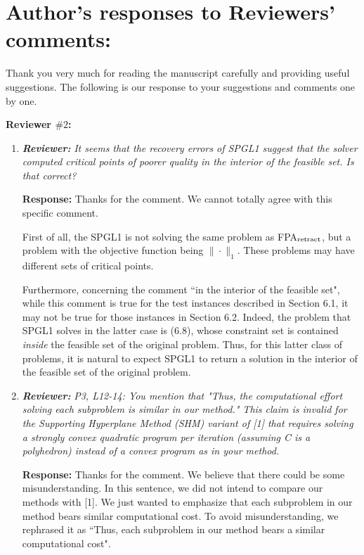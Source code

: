 \documentclass{article}
\begin{document}
\section*{Author's responses to Reviewers' comments:}
Thank you very much for reading the manuscript carefully and providing useful suggestions. The following is our response to your suggestions and comments one by one.

\textbf{Reviewer $\# 2$:}

\begin{enumerate}
	\item \textit{\textbf{Reviewer:}} \textit{ It seems that the recovery errors of SPGL1 suggest that the solver computed critical points of poorer quality in the interior of the feasible set. Is that correct?}
	
	\textbf{Response:} Thanks for the comment. We cannot totally agree with this specific comment. 

First of all, the SPGL1 is not solving the same problem as FPA$_{\rm retract}$, but a problem with the objective function being $\|\cdot\|_1$. These problems may have different sets of critical points. 

Furthermore, concerning the comment ``in the interior of the feasible set", while this comment is true for the test instances described in Section 6.1, it may not be true for those instances in Section 6.2. Indeed, the problem that SPGL1 solves in the latter case is (6.8), whose constraint set is contained \emph{inside} the feasible set of the original problem. Thus, for this latter class of problems, it is natural to expect SPGL1 to return a solution in the interior of the feasible set of the original problem.
	
    \item \textit{\textbf{Reviewer:}} \textit{P3, L12-14: You mention that "Thus, the computational effort solving each subproblem is similar in our method."
        This claim is invalid for the Supporting Hyperplane Method (SHM) variant of [1] that requires solving a strongly convex quadratic program per iteration (assuming C is a polyhedron) instead of a convex program as in your method.}
	
    \textbf{Response:} Thanks for the comment.  We believe that there could be some misunderstanding. In this sentence, we did not intend to compare our methods with [1]. We just wanted to emphasize that each subproblem in our method bears similar computational cost. To avoid misunderstanding, we rephrased it as ``Thus, each subproblem in our method bears a similar computational cost".
\end{enumerate}	
\end{document}
